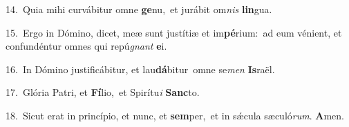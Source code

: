 {\numbfont\textcolor{\numbcolor}{14.}}~Quia mihi curvábitur omne \textbf{ge}\-nu,~\star et jurábit om\textit{nis} \textbf{lin}\-gua.\par
{\numbfont\textcolor{\numbcolor}{15.}}~Ergo in Dómino, dicet, meæ sunt justítiæ et im\-\textbf{pé}\-rium:~\star ad eum vénient, et confundéntur omnes qui repú\textit{gnant} \textbf{e}\-i.\par
{\numbfont\textcolor{\numbcolor}{16.}}~In Dómino justificábitur, et lau\-\textbf{dá}\-bitur~\star omne se\textit{men} \textbf{Is}\-raël.\par
{\numbfont\textcolor{\numbcolor}{17.}}~Glória Patri, et \textbf{Fí}\-lio,~\star et Spirítu\textit{i} \textbf{Sanc}\-to.\par
{\numbfont\textcolor{\numbcolor}{18.}}~Sicut erat in princípio, et nunc, et \textbf{sem}\-per,~\star et in sǽcula sæculó\-\textit{rum}\-. \textbf{A}\-men.\par
